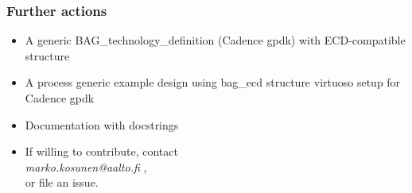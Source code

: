\documentclass[logo=bluequo,normaltitle]{aaltoslides}
\begin{document}
\begin{frame}[t]
    \frametitle{Further actions}
    \begin{itemize}
        \item  A generic BAG\_technology\_definition  (Cadence gpdk) with ECD-compatible structure
        \item  A process generic example design using bag\_ecd structure
            virtuoso setup for Cadence gpdk
        \item Documentation with docstrings
        \item If willing to contribute, contact
            \\\emph{marko.kosunen@aalto.fi} ,\\
            or file an issue.
    \end{itemize}
\end{frame}
\end{document}
